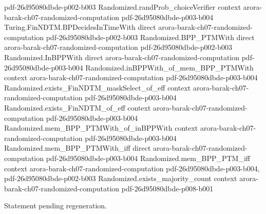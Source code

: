 \begin{theorem}
  {pdf-26d95080dbde-p002-b003}
\proofstep
  {Randomized.randProb_choiceVerifier}
  {context}
  {arora-barak-ch07-randomized-computation}
  {pdf-26d95080dbde-p003-b004}
\proofstep
  {Turing.FinNDTM.BPDecidesInTimeWith}
  {direct}
  {arora-barak-ch07-randomized-computation}
  {pdf-26d95080dbde-p002-b003}
\proofstep
  {Randomized.BPP_PTMWith}
  {direct}
  {arora-barak-ch07-randomized-computation}
  {pdf-26d95080dbde-p002-b003}
\proofstep
  {Randomized.InBPPWith}
  {direct}
  {arora-barak-ch07-randomized-computation}
  {pdf-26d95080dbde-p003-b004}
\proofstep
  {Randomized.inBPPWith_of_mem_BPP_PTMWith}
  {context}
  {arora-barak-ch07-randomized-computation}
  {pdf-26d95080dbde-p003-b004}
\proofstep
  {Randomized.exists_FinNDTM_maskSelect_of_eff}
  {context}
  {arora-barak-ch07-randomized-computation}
  {pdf-26d95080dbde-p003-b004}
\proofstep
  {Randomized.exists_FinNDTM_of_eff}
  {context}
  {arora-barak-ch07-randomized-computation}
  {pdf-26d95080dbde-p003-b004}
\proofstep
  {Randomized.mem_BPP_PTMWith_of_inBPPWith}
  {context}
  {arora-barak-ch07-randomized-computation}
  {pdf-26d95080dbde-p003-b004}
\proofstep
  {Randomized.mem_BPP_PTMWith_iff}
  {direct}
  {arora-barak-ch07-randomized-computation}
  {pdf-26d95080dbde-p003-b004}
\proofstep
  {Randomized.mem_BPP_PTM_iff}
  {context}
  {arora-barak-ch07-randomized-computation}
  {pdf-26d95080dbde-p003-b004,
    pdf-26d95080dbde-p002-b003}
\proofstep
  {Randomized.exists_majority_count}
  {context}
  {arora-barak-ch07-randomized-computation}
  {pdf-26d95080dbde-p008-b001}

Statement pending regeneration.
\end{theorem}
